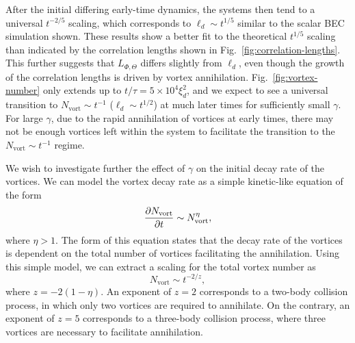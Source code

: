 After the initial differing early-time dynamics, the systems then tend to a
universal \(t^{-2/5}\) scaling, which corresponds to \(\ell_d\sim t^{1/5}\)
similar to the scalar BEC simulation shown.
These results show a better fit to the theoretical \(t^{1/5}\) scaling than 
indicated by the correlation lengths shown in
Fig.~\ref{fig:correlation-lengths}.
This further suggests that \(L_{\Phi,\Theta}\) differs slightly from \(\ell_d\),
even though the growth of the correlation lengths is driven by vortex
annihilation.
Fig.~\ref{fig:vortex-number} only extends up to \(t/\tau=5\times 10^4\xi_d^2\),
and we expect to see a universal transition to
\(N_\mathrm{vort}\sim t^{-1}\) (\(\ell_d\sim t^{1/2}\)) at much later times for
sufficiently small \(\gamma \).
For large \(\gamma \), due to the rapid annihilation of vortices at early times,
there may not be enough vortices left within the system to facilitate the
transition to the \(N_\mathrm{vort} \sim t^{-1}\) regime.
\par
We wish to investigate further the effect of \(\gamma \) on the initial decay
rate of the vortices.
We can model the vortex decay rate as a simple kinetic-like equation of the form
\begin{equation}
    \pdv{N_\mathrm{vort}}{t} \sim N_\mathrm{vort}^\eta,
\end{equation}
where \(\eta > 1\).
The form of this equation states that the decay rate of the vortices is
dependent on the total number of vortices facilitating the annihilation.
Using this simple model, we can extract a scaling for the total vortex
number as
\begin{equation}
    N_\mathrm{vort} \sim t^{-2/z},
    \label{eq:vortex-number-scaling}
\end{equation}
where \(z=-2(1-\eta)\).
An exponent of \(z=2\) corresponds to a two-body collision process, in which
only two vortices are required to annihilate.
On the contrary, an exponent of \(z=5\) corresponds to a three-body collision
process, where three vortices are necessary to facilitate annihilation.
